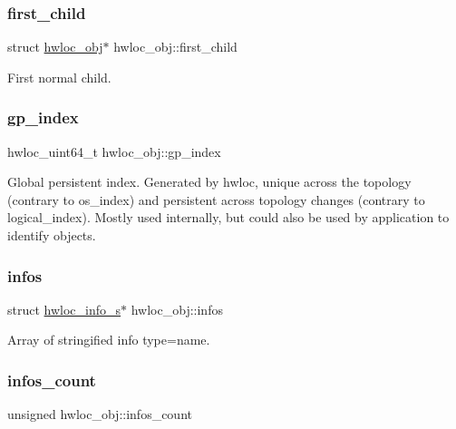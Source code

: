 \subsubsection{\texorpdfstring{first\+\_\+child}{first\_child}}
{\footnotesize\ttfamily struct \hyperlink{a00238}{hwloc\+\_\+obj}$\ast$ hwloc\+\_\+obj\+::first\+\_\+child}



First normal child. 

\mbox{\label{a00238_a957984a355fa61c85f46605c336e7551}} 
\subsubsection{\texorpdfstring{gp\+\_\+index}{gp\_index}}
{\footnotesize\ttfamily hwloc\+\_\+uint64\+\_\+t hwloc\+\_\+obj\+::gp\+\_\+index}



Global persistent index. Generated by hwloc, unique across the topology (contrary to os\+\_\+index) and persistent across topology changes (contrary to logical\+\_\+index). Mostly used internally, but could also be used by application to identify objects. 

\mbox{\label{a00238_a8604654c38b7a720efae5025d3a96ee6}} 
\subsubsection{\texorpdfstring{infos}{infos}}
{\footnotesize\ttfamily struct \hyperlink{a00286}{hwloc\+\_\+info\+\_\+s}$\ast$ hwloc\+\_\+obj\+::infos}



Array of stringified info type=name. 

\mbox{\label{a00238_a9843acc28cfbba903b63ea14b137ff70}} 
\subsubsection{\texorpdfstring{infos\+\_\+count}{infos\_count}}
{\footnotesize\ttfamily unsigned hwloc\+\_\+obj\+::infos\+\_\+count}



